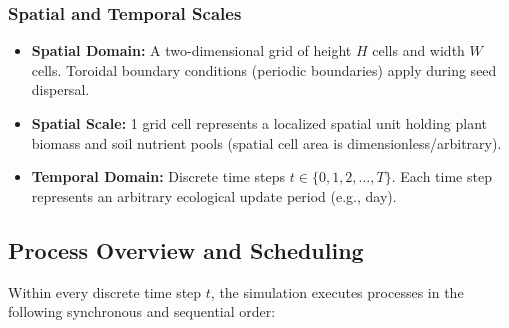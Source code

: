 \documentclass[11pt,a4paper]{article}
\begin{document}
\subsubsection{Spatial and Temporal Scales}
\begin{itemize}
    \item \textbf{Spatial Domain:} A two-dimensional grid of height $H$ cells and width $W$ cells. Toroidal boundary conditions (periodic boundaries) apply during seed dispersal.
    \item \textbf{Spatial Scale:} 1 grid cell represents a localized spatial unit holding plant biomass and soil nutrient pools (spatial cell area is dimensionless/arbitrary).
    \item \textbf{Temporal Domain:} Discrete time steps $t \in \{0, 1, 2, \dots, T\}$. Each time step represents an arbitrary ecological update period (e.g., day).
\end{itemize}

\subsection{Process Overview and Scheduling}
Within every discrete time step $t$, the simulation executes processes in the following synchronous and sequential order:
\end{document}
